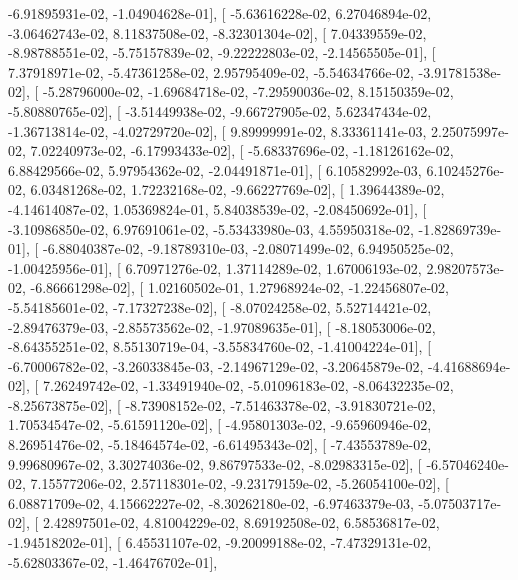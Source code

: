 \documentclass{article}
\begin{document}
         -6.91895931e-02,  -1.04904628e-01],
       [ -5.63616228e-02,   6.27046894e-02,  -3.06462743e-02,
          8.11837508e-02,  -8.32301304e-02],
       [  7.04339559e-02,  -8.98788551e-02,  -5.75157839e-02,
         -9.22222803e-02,  -2.14565505e-01],
       [  7.37918971e-02,  -5.47361258e-02,   2.95795409e-02,
         -5.54634766e-02,  -3.91781538e-02],
       [ -5.28796000e-02,  -1.69684718e-02,  -7.29590036e-02,
          8.15150359e-02,  -5.80880765e-02],
       [ -3.51449938e-02,  -9.66727905e-02,   5.62347434e-02,
         -1.36713814e-02,  -4.02729720e-02],
       [  9.89999991e-02,   8.33361141e-03,   2.25075997e-02,
          7.02240973e-02,  -6.17993433e-02],
       [ -5.68337696e-02,  -1.18126162e-02,   6.88429566e-02,
          5.97954362e-02,  -2.04491871e-01],
       [  6.10582992e-03,   6.10245276e-02,   6.03481268e-02,
          1.72232168e-02,  -9.66227769e-02],
       [  1.39644389e-02,  -4.14614087e-02,   1.05369824e-01,
          5.84038539e-02,  -2.08450692e-01],
       [ -3.10986850e-02,   6.97691061e-02,  -5.53433980e-03,
          4.55950318e-02,  -1.82869739e-01],
       [ -6.88040387e-02,  -9.18789310e-03,  -2.08071499e-02,
          6.94950525e-02,  -1.00425956e-01],
       [  6.70971276e-02,   1.37114289e-02,   1.67006193e-02,
          2.98207573e-02,  -6.86661298e-02],
       [  1.02160502e-01,   1.27968924e-02,  -1.22456807e-02,
         -5.54185601e-02,  -7.17327238e-02],
       [ -8.07024258e-02,   5.52714421e-02,  -2.89476379e-03,
         -2.85573562e-02,  -1.97089635e-01],
       [ -8.18053006e-02,  -8.64355251e-02,   8.55130719e-04,
         -3.55834760e-02,  -1.41004224e-01],
       [ -6.70006782e-02,  -3.26033845e-03,  -2.14967129e-02,
         -3.20645879e-02,  -4.41688694e-02],
       [  7.26249742e-02,  -1.33491940e-02,  -5.01096183e-02,
         -8.06432235e-02,  -8.25673875e-02],
       [ -8.73908152e-02,  -7.51463378e-02,  -3.91830721e-02,
          1.70534547e-02,  -5.61591120e-02],
       [ -4.95801303e-02,  -9.65960946e-02,   8.26951476e-02,
         -5.18464574e-02,  -6.61495343e-02],
       [ -7.43553789e-02,   9.99680967e-02,   3.30274036e-02,
          9.86797533e-02,  -8.02983315e-02],
       [ -6.57046240e-02,   7.15577206e-02,   2.57118301e-02,
         -9.23179159e-02,  -5.26054100e-02],
       [  6.08871709e-02,   4.15662227e-02,  -8.30262180e-02,
         -6.97463379e-03,  -5.07503717e-02],
       [  2.42897501e-02,   4.81004229e-02,   8.69192508e-02,
          6.58536817e-02,  -1.94518202e-01],
       [  6.45531107e-02,  -9.20099188e-02,  -7.47329131e-02,
         -5.62803367e-02,  -1.46476702e-01],
\end{document}
